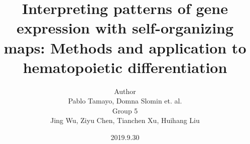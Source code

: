 \title[SOM]{Interpreting patterns of gene expression with self-organizing maps: Methods and application to hematopoietic differentiation}
\author[Pablo Tamayo et. al.]{{\scriptsize Author} \\ Pablo Tamayo, Domna Slomin et. al. \\ \vspace{1em} {\scriptsize Group 5}\\ Jing Wu, Ziyu Chen, Tianchen Xu, Huihang Liu}
\date{2019.9.30}
\maketitle



        
        
        
        
        
        
        




